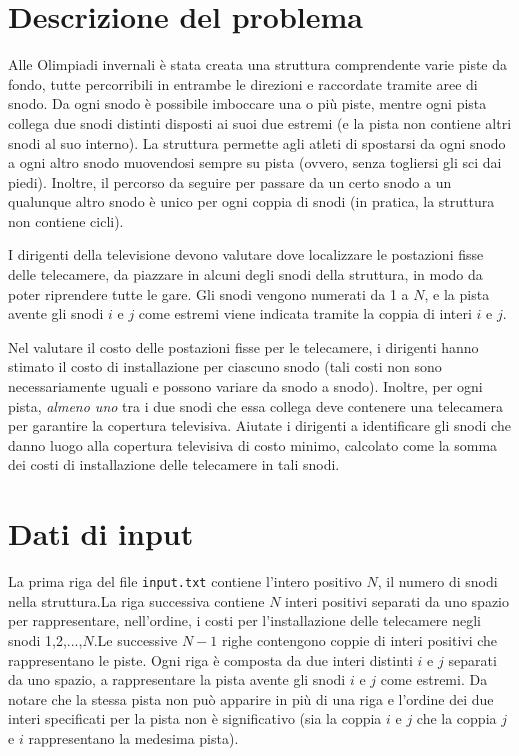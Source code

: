 \documentclass[a4paper,11pt]{article}
\begin{document}
\vspace{0.5cm}



\vspace{0.5cm}

\section*{Descrizione del problema}
   
Alle Olimpiadi invernali è stata creata una struttura
comprendente varie piste da fondo, tutte percorribili in entrambe le
direzioni e raccordate tramite aree di snodo.  Da ogni snodo è
possibile imboccare una o più piste, mentre ogni pista collega
due snodi distinti disposti ai suoi due estremi (e la pista non
contiene altri snodi al suo interno). La struttura
permette agli atleti di spostarsi da ogni snodo a ogni altro snodo
muovendosi sempre su pista (ovvero, senza togliersi gli sci dai
piedi).  Inoltre, il percorso da seguire per passare da un certo snodo
a un qualunque altro snodo è unico per ogni coppia di snodi (in
pratica, la struttura non contiene cicli).

I dirigenti della televisione devono valutare dove localizzare le
postazioni fisse delle telecamere, da piazzare in alcuni degli snodi
della struttura, in modo da poter riprendere tutte le gare.  Gli snodi
vengono numerati da 1 a $N$, e la pista avente gli snodi
$i$ e $j$ come estremi viene indicata tramite la
coppia di interi $i$ e $j$.

Nel valutare il costo delle postazioni fisse per le telecamere, i
dirigenti hanno stimato il costo di installazione per ciascuno snodo
(tali costi non sono necessariamente uguali e possono variare da snodo
a snodo). Inoltre, per ogni pista, \emph{almeno uno} tra i due snodi
che essa collega deve contenere una telecamera per garantire la
copertura televisiva.
Aiutate i dirigenti a identificare gli snodi che danno luogo alla
copertura televisiva di costo minimo, calcolato come la somma dei
costi di installazione delle telecamere in tali snodi.


\section*{Dati di input}
  La prima riga del file \texttt{input.txt} contiene l'intero
positivo $N$, il numero di snodi nella struttura.La riga successiva contiene $N$ interi positivi separati da uno
spazio per rappresentare, nell'ordine, i costi per l'installazione delle
telecamere negli snodi 1,2,...,$N$.Le successive $N - 1$ righe contengono coppie di interi
positivi che rappresentano le piste. Ogni riga è composta da
due interi distinti $i$ e $j$ separati da uno
spazio, a rappresentare la pista avente gli snodi $i$ e
$j$ come estremi. Da notare che la stessa pista non
può apparire in più di una riga e l'ordine dei due
interi specificati per la pista non è significativo (sia la
coppia $i$ e $j$ che la coppia $j$ e
$i$ rappresentano la medesima pista).
\end{document}
